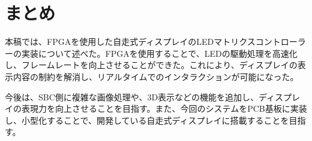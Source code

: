 \documentclass[a4paper,11pt, twocolumn]{ltjsarticle}
\begin{document}
\section{まとめ}
本稿では、FPGAを使用した自走式ディスプレイのLEDマトリクスコントローラーの実装について述べた。FPGAを使用することで、LEDの駆動処理を高速化し、フレームレートを向上させることができた。これにより、ディスプレイの表示内容の制約を解消し、リアルタイムでのインタラクションが可能になった。

今後は、SBC側に複雑な画像処理や、3D表示などの機能を追加し、ディスプレイの表現力を向上させることを目指す。また、今回のシステムをPCB基板に実装し、小型化することで、開発している自走式ディスプレイに搭載することを目指す。

\printbibliography[title=参考文献]
\end{document}
